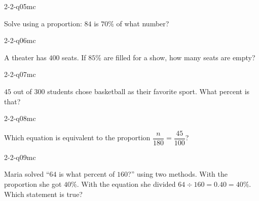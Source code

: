 \begin{practiceQuestion}{2-2-q05}{mc}
\begin{questionText}
Solve using a proportion: $84$ is $70\%$ of what number?
\end{questionText}
\end{practiceQuestion}

\begin{practiceQuestion}{2-2-q06}{mc}
\begin{questionText}
A theater has $400$ seats. If $85\%$ are filled for a show, how many seats are empty?
\end{questionText}
\end{practiceQuestion}

\begin{practiceQuestion}{2-2-q07}{mc}
\begin{questionText}
$45$ out of $300$ students chose basketball as their favorite sport. What percent is that?
\end{questionText}
\end{practiceQuestion}

\begin{practiceQuestion}{2-2-q08}{mc}
\begin{questionText}
Which equation is equivalent to the proportion $\dfrac{n}{180} = \dfrac{45}{100}$?
\end{questionText}
\end{practiceQuestion}

\begin{practiceQuestion}{2-2-q09}{mc}
\begin{questionText}
Maria solved ``$64$ is what percent of $160$?'' using two methods. With the proportion she got $40\%$. With the equation she divided $64 \div 160 = 0.40 = 40\%$. Which statement is true?
\end{questionText}
\end{practiceQuestion}

